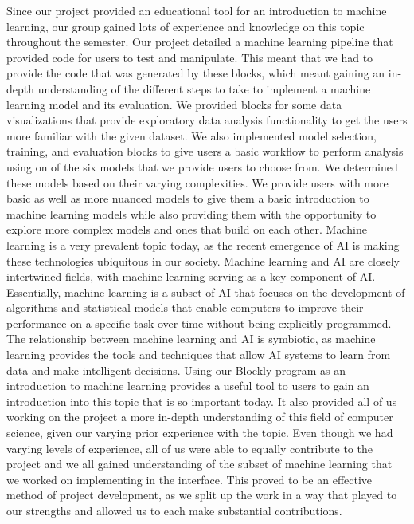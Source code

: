 \documentclass{article}
\theoremstyle{theorem}
\theoremstyle{definition}
\theoremstyle{remark}
\begin{document}
Since our project provided an educational tool for an introduction to machine learning, our group gained lots of experience and knowledge on this topic throughout the semester. Our project detailed a machine learning pipeline that provided code for users to test and manipulate. This meant that we had to provide the code that was generated by these blocks, which meant gaining an in-depth understanding of the different steps to take to implement a machine learning model and its evaluation. We provided blocks for some data visualizations that provide exploratory data analysis functionality to get the users more familiar with the given dataset. We also implemented model selection, training, and evaluation blocks to give users a basic workflow to perform analysis using on of the six models that we provide users to choose from. We determined these models based on their varying complexities. We provide users with more basic as well as more nuanced models to give them a basic introduction to machine learning models while also providing them with the opportunity to explore more complex models and ones that build on each other. Machine learning is a very prevalent topic today, as the recent emergence of AI is making these technologies ubiquitous in our society. Machine learning and AI are closely intertwined fields, with machine learning serving as a key component of AI. Essentially, machine learning is a subset of AI that focuses on the development of algorithms and statistical models that enable computers to improve their performance on a specific task over time without being explicitly programmed. The relationship between machine learning and AI is symbiotic, as machine learning provides the tools and techniques that allow AI systems to learn from data and make intelligent decisions. Using our Blockly program as an introduction to machine learning provides a useful tool to users to gain an introduction into this topic that is so important today. It also provided all of us working on the project a more in-depth understanding of this field of computer science, given our varying prior experience with the topic. Even though we had varying levels of experience, all of us were able to equally contribute to the project and we all gained understanding of the subset of machine learning that we worked on implementing in the interface. This proved to be an effective method of project development, as we split up the work in a way that played to our strengths and allowed us to each make substantial contributions. 
\end{document}
